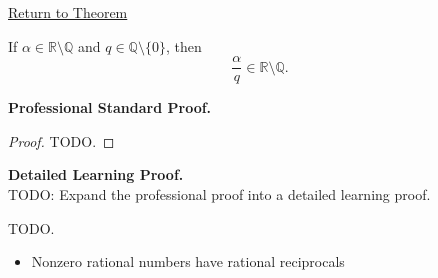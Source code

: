 \newpage
{}
\label{prf:quotient-by-nonzero-rational-preserves-irrationality}

\begin{remark*}[Return]
\hyperref[thm:quotient-by-nonzero-rational-preserves-irrationality]{Return to Theorem}
\end{remark*}

\begin{theorem*}
If $\alpha\in\mathbb{R}\setminus\mathbb{Q}$ and
$q\in\mathbb{Q}\setminus\{0\}$, then
\[
\frac{\alpha}{q}\in\mathbb{R}\setminus\mathbb{Q}.
\]
\end{theorem*}

\textbf{Professional Standard Proof.}~\\
\begin{proof}
TODO.
\end{proof}

\textbf{Detailed Learning Proof.}~\\
TODO: Expand the professional proof into a detailed learning proof.


\begin{remark*}
TODO.
\end{remark*}

\begin{dependencies}
\begin{itemize}
  \item Nonzero rational numbers have rational reciprocals
\end{itemize}
\end{dependencies}

